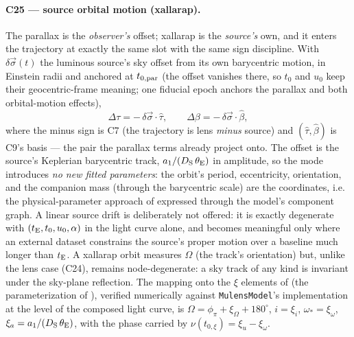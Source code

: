 \paragraph{C25 --- source orbital motion (xallarap).}  The parallax is the
\emph{observer's} offset; xallarap is the \emph{source's} own, and it
enters the trajectory at exactly the same slot with the same sign
discipline.  With $\delta\vec{\sigma}(t)$ the luminous source's sky offset
from its own barycentric motion, in Einstein radii and anchored at
$t_{0,\rm par}$ (the offset vanishes there, so $t_0$ and $u_0$ keep their
geocentric-frame meaning; one fiducial epoch anchors the parallax and both
orbital-motion effects),
\begin{equation}
\Delta\tau = -\,\delta\vec{\sigma}\cdot\hat{\tau}, \qquad
\Delta\beta = -\,\delta\vec{\sigma}\cdot\hat{\beta},
\end{equation}
where the minus sign is C7 (the trajectory is lens \emph{minus} source)
and $(\hat{\tau}, \hat{\beta})$ is C9's basis --- the pair the parallax
terms already project onto.  The offset is the source's Keplerian
barycentric track, $a_1/(D_{\rm S}\,\theta_{\rm E})$ in amplitude, so the
mode introduces \emph{no new fitted parameters}: the orbit's period,
eccentricity, orientation, and the companion mass (through the barycentric
scale) are the coordinates, i.e. the physical-parameter approach of
\citet{Mroz:2026} expressed through the model's component graph.  A linear
source drift is deliberately not offered: it is exactly degenerate with
$(t_{\rm E}, t_0, u_0, \alpha)$ in the light curve alone, and becomes
meaningful only where an external dataset constrains the source's proper
motion over a baseline much longer than $t_{\rm E}$.  A xallarap orbit
measures $\Omega$ (the track's orientation) but, unlike the lens case
(C24), remains node-degenerate: a sky track of any kind is invariant under
the sky-plane reflection.  The mapping onto the $\xi$ elements of
\citet{Zhai:2024} (the parameterization of \citealt{Mroz:2026}), verified
numerically against \texttt{MulensModel}'s implementation at the level of
the composed light curve, is
$\Omega = \phi_\pi + \xi_\Omega + 180^\circ$,
$i = \xi_i$, $\omega_* = \xi_\omega$,
$\xi_a = a_1/(D_{\rm S}\,\theta_{\rm E})$, with the phase carried by
$\nu(t_{0,\xi}) = \xi_u - \xi_\omega$.

